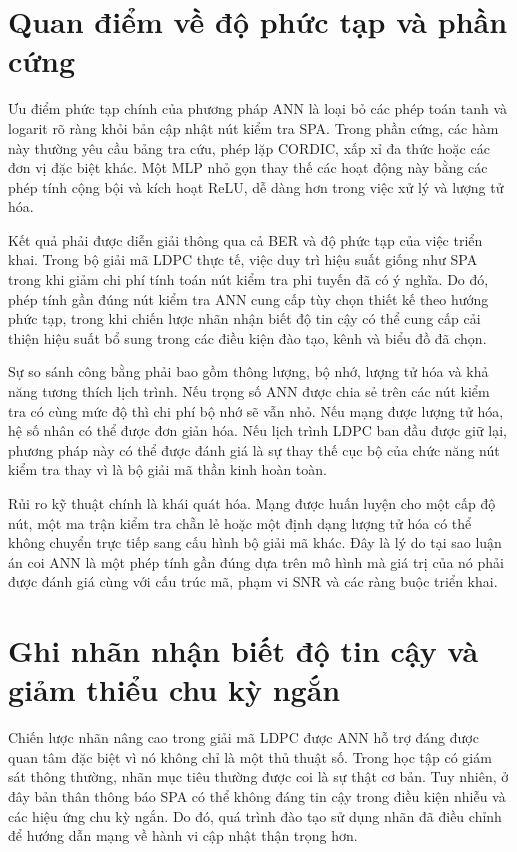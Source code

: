 \section{Quan điểm về độ phức tạp và phần cứng}
Ưu điểm phức tạp chính của phương pháp ANN là loại bỏ các phép toán tanh và logarit rõ ràng khỏi bản cập nhật nút kiểm tra SPA. Trong phần cứng, các hàm này thường yêu cầu bảng tra cứu, phép lặp CORDIC, xấp xỉ đa thức hoặc các đơn vị đặc biệt khác. Một MLP nhỏ gọn thay thế các hoạt động này bằng các phép tính cộng bội và kích hoạt ReLU, dễ dàng hơn trong việc xử lý và lượng tử hóa.

Kết quả phải được diễn giải thông qua cả BER và độ phức tạp của việc triển khai. Trong bộ giải mã LDPC thực tế, việc duy trì hiệu suất giống như SPA trong khi giảm chi phí tính toán nút kiểm tra phi tuyến đã có ý nghĩa. Do đó, phép tính gần đúng nút kiểm tra ANN cung cấp tùy chọn thiết kế theo hướng phức tạp, trong khi chiến lược nhãn nhận biết độ tin cậy có thể cung cấp cải thiện hiệu suất bổ sung trong các điều kiện đào tạo, kênh và biểu đồ đã chọn.

Sự so sánh công bằng phải bao gồm thông lượng, bộ nhớ, lượng tử hóa và khả năng tương thích lịch trình. Nếu trọng số ANN được chia sẻ trên các nút kiểm tra có cùng mức độ thì chi phí bộ nhớ sẽ vẫn nhỏ. Nếu mạng được lượng tử hóa, hệ số nhân có thể được đơn giản hóa. Nếu lịch trình LDPC ban đầu được giữ lại, phương pháp này có thể được đánh giá là sự thay thế cục bộ của chức năng nút kiểm tra thay vì là bộ giải mã thần kinh hoàn toàn.

Rủi ro kỹ thuật chính là khái quát hóa. Mạng được huấn luyện cho một cấp độ nút, một ma trận kiểm tra chẵn lẻ hoặc một định dạng lượng tử hóa có thể không chuyển trực tiếp sang cấu hình bộ giải mã khác. Đây là lý do tại sao luận án coi ANN là một phép tính gần đúng dựa trên mô hình mà giá trị của nó phải được đánh giá cùng với cấu trúc mã, phạm vi SNR và các ràng buộc triển khai.
\section{Ghi nhãn nhận biết độ tin cậy và giảm thiểu chu kỳ ngắn}
Chiến lược nhãn nâng cao trong giải mã LDPC được ANN hỗ trợ đáng được quan tâm đặc biệt vì nó không chỉ là một thủ thuật số. Trong học tập có giám sát thông thường, nhãn mục tiêu thường được coi là sự thật cơ bản. Tuy nhiên, ở đây bản thân thông báo SPA có thể không đáng tin cậy trong điều kiện nhiễu và các hiệu ứng chu kỳ ngắn. Do đó, quá trình đào tạo sử dụng nhãn đã điều chỉnh để hướng dẫn mạng về hành vi cập nhật thận trọng hơn.


